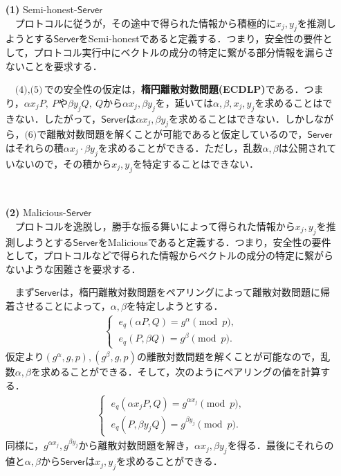 \documentclass[a4paper]{jsarticle}
\begin{document}
\begin{enumerate}
\item[\textbf{(1)}] Semi-honest-$\mathsf{Server}$\\
　プロトコルに従うが，その途中で得られた情報から積極的に$x_j,y_j$を推測しようとする$\mathsf{Server}$をSemi-honestであると定義する．つまり，安全性の要件として，プロトコル実行中にベクトルの成分の特定に繋がる部分情報を漏らさないことを要求する．

　$\textit{(4)},\textit{(5)}$での安全性の仮定は，\textbf{楕円離散対数問題(ECDLP)}である．つまり，$\alpha x_j P,\ P$や$\beta y_j Q,\ Q$から$\alpha x_j, \beta y_j$を，延いては$\alpha, \beta, x_j, y_j$を求めることはできない．したがって，$\mathsf{Server}$は$\alpha x_j, \beta y_j$を求めることはできない．しかしながら，$\textit{(6)}$で離散対数問題を解くことが可能であると仮定しているので，$\mathsf{Server}$はそれらの積$\alpha x_j\cdot\beta y_j$を求めることができる．ただし，乱数$\alpha, \beta$は公開されていないので，その積から$x_j, y_j$を特定することはできない．

\ \ \ \ 

\item[\textbf{(2)}] Malicious-$\mathsf{Server}$\\
　プロトコルを逸脱し，勝手な振る舞いによって得られた情報から$x_j,y_j$を推測しようとする$\mathsf{Server}$をMaliciousであると定義する．つまり，安全性の要件として，プロトコルなどで得られた情報からベクトルの成分の特定に繋がらないような困難さを要求する．

　まず$\mathsf{Server}$は，楕円離散対数問題をペアリングによって離散対数問題に帰着させることによって，$\alpha,\beta$を特定しようとする．\begin{align}
\begin{cases}
\ e_q(\alpha P,Q) = g^{\alpha} \pmod{p},\\
\ e_q(P,\beta Q) = g^{\beta} \pmod{p}.
\end{cases}
\end{align}
仮定より$(g^\alpha, g, p),(g^\beta, g, p)$の離散対数問題を解くことが可能なので，乱数$\alpha,\beta$を求めることができる．そして，次のようにペアリングの値を計算する．
\begin{align}
\begin{cases}
\ e_q(\alpha x_j P,Q) = g^{\alpha x_j} \pmod{p},\\
\ e_q(P,\beta y_j Q) = g^{\beta y_j} \pmod{p}.
\end{cases}
\end{align}
同様に，$g^{\alpha x_j},g^{\beta y_j}$から離散対数問題を解き，$\alpha x_j,\beta y_j$を得る．最後にそれらの値と$\alpha, \beta$から$\mathsf{Server}$は$x_j,y_j$を求めることができる．


\end{enumerate}
\end{document}

